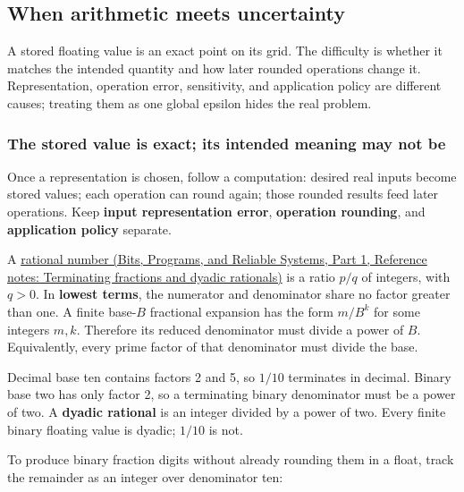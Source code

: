 \subsection{When arithmetic meets uncertainty}\label{05-engine-i-ch001-when-arithmetic-meets-uncertainty}

\hypertarget{05-engine-i-ch001-when-arithmetic-meets-uncertainty}{}

A stored floating value is an exact point on its grid. The difficulty is whether it matches the intended quantity and how later rounded operations change it. Representation, operation error, sensitivity, and application policy are different causes; treating them as one global epsilon hides the real problem.

\subsubsection{The stored value is exact; its intended meaning may not be}\label{05-engine-i-ch001-the-stored-value-is-exact-its-intended-meaning-may-not-be}

\hypertarget{05-engine-i-ch001-the-stored-value-is-exact-its-intended-meaning-may-not-be}{}

Once a representation is chosen, follow a computation: desired real inputs become stored values; each operation can round again; those rounded results feed later operations. Keep \textbf{input representation error}, \textbf{operation rounding}, and \textbf{application policy} separate.

A \href{../01-Bits-Programs-and-Reliable-Systems-P01/main.pdf\#appendix-2a2f1b74bdd3}{rational number (Bits, Programs, and Reliable Systems, Part 1, Reference notes: Terminating fractions and dyadic rationals)} is a ratio \(p/q\) of integers, with \(q>0\). In \textbf{lowest terms}, the numerator and denominator share no factor greater than one. A finite base-\(B\) fractional expansion has the form \(m/B^k\) for some integers \(m,k\). Therefore its reduced denominator must divide a power of \(B\). Equivalently, every prime factor of that denominator must divide the base.

Decimal base ten contains factors 2 and 5, so \(1/10\) terminates in decimal. Binary base two has only factor 2, so a terminating binary denominator must be a power of two. A \textbf{dyadic rational} is an integer divided by a power of two. Every finite binary floating value is dyadic; \(1/10\) is not.

To produce binary fraction digits without already rounding them in a float, track the remainder as an integer over denominator ten:

